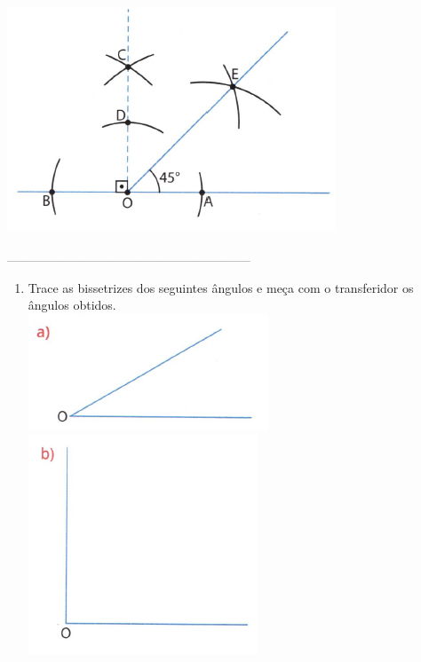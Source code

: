 \documentclass[a4paper,14pt]{article}
\begin{document}
\begin{multicols}{2}
\begin{itemize}
			\includegraphics[width=1\linewidth]{6FMA87_imagens/imagem4}
		\end{itemize}
		\noindent\textsubscript{-----------------------------------------------------------------------}
		\begin{enumerate} 
			\item Trace as bissetrizes dos seguintes ângulos e meça com o transferidor os ângulos obtidos. \\
			\includegraphics[width=1\linewidth]{6FMA87_imagens/imagem5}
			\includegraphics[width=1\linewidth]{6FMA87_imagens/imagem6}

\end{enumerate}
\end{multicols}
\end{document}
